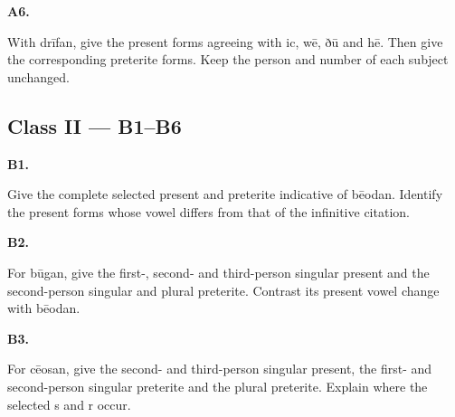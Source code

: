 \par\begin{minipage}{\linewidth}\raggedright
\textbf{A6.}

With drīfan, give the present forms agreeing with ic, wē, ðū and hē. Then give the corresponding preterite forms. Keep the person and number of each subject unchanged.

\end{minipage}\par\addvspace{4pt}

\subsection*{Class II — B1–B6}

\par\begin{minipage}{\linewidth}\raggedright
\textbf{B1.}

Give the complete selected present and preterite indicative of bēodan. Identify the present forms whose vowel differs from that of the infinitive citation.

\end{minipage}\par\addvspace{4pt}

\par\begin{minipage}{\linewidth}\raggedright
\textbf{B2.}

For būgan, give the first-, second- and third-person singular present and the second-person singular and plural preterite. Contrast its present vowel change with bēodan.

\end{minipage}\par\addvspace{4pt}

\par\begin{minipage}{\linewidth}\raggedright
\textbf{B3.}

For cēosan, give the second- and third-person singular present, the first- and second-person singular preterite and the plural preterite. Explain where the selected s and r occur.

\end{minipage}\par\addvspace{4pt}

